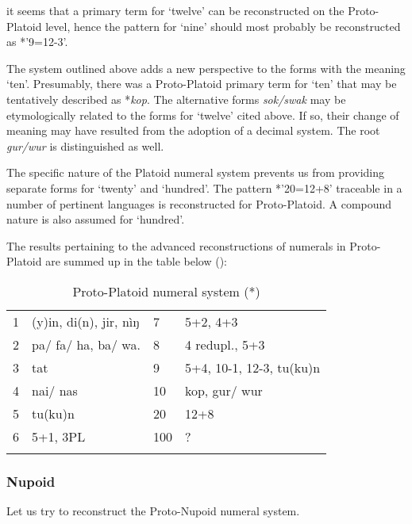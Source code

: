 it seems that a primary term for ‘twelve’ can be reconstructed on the Proto-Platoid level, hence the pattern for ‘nine’ should most probably be reconstructed as *’9=12-3’. 

The system outlined above adds a new perspective to the forms with the meaning ‘ten’. Presumably, there was a Proto-Platoid primary term for ‘ten’ that may be tentatively described as *\textit{kop}. The alternative forms \textit{sok/swak} may be etymologically related to the forms for ‘twelve’ cited above. If so, their change of meaning may have resulted from the adoption of a decimal system. The root \textit{gur/wur} is distinguished as well.

The specific nature of the Platoid numeral system prevents us from providing separate forms for ‘twenty’ and ‘hundred’. The pattern *’20=12+8’ traceable in a number of pertinent languages is reconstructed for Proto-Platoid. A compound nature is also assumed for ‘hundred’.

The results pertaining to the advanced reconstructions of numerals in Proto-Platoid are summed up in the table below ():

\begin{table}
\caption{\label{tab:3:47}Proto-Platoid numeral system (*)}

\begin{tabularx}{\textwidth}{lXlX}
\lsptoprule

{1} & (y)in, di(n), jir, nìŋ & {7} & 5+2, 4+3\\
{2} & pa/ fa/ ha, ba/ wa. & {8} & 4 redupl., 5+3\\
{3} & tat & {9} & 5+4, 10-1, 12-3, tu(ku)n\\
{4} & nai/ nas & {10} & kop, gur/ wur\\
{5} & tu(ku)n & {20} & 12+8\\
{6} & 5+1, 3PL & {100} & ?\\
\lspbottomrule
\end{tabularx}
\end{table}

\clearpage
\subsubsection{Nupoid}\label{sec:3.1.2.9}
Let us try to reconstruct the Proto-Nupoid numeral system.

